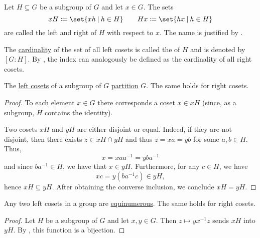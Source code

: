 \begin{definition}\label{def:group_cosets}
  Let \( H \subseteq G \) be a subgroup of \( G \) and let \( x \in G \). The sets
  \begin{equation*}
    x H \coloneqq \set{ xh \given h \in H }
    \quad\quad
    H x \coloneqq \set{ hx \given h \in H }
  \end{equation*}
  are called the left and right  of \( H \) with respect to \( x \). The name is justified by .

  The \hyperref[def:cardinal]{cardinality} of the set of all left cosets is called the  of \( H \) and is denoted by \( [G : H] \). By , the index can analogously be defined as the cardinality of all right cosets.
\end{definition}

\begin{lemma}\label{thm:group_coset_partition}
  The \hyperref[def:group_cosets]{left cosets} of a subgroup of \( G \) \hyperref[def:set_partition]{partition} \( G \). The same holds for right cosets.
\end{lemma}
\begin{proof}
  To each element \( x \in G \) there corresponds a coset \( x \in xH \) (since, as a subgroup, \( H \) contains the identity).

  Two cosets \( xH \) and \( yH \) are either disjoint or equal. Indeed, if they are not disjoint, then there exists \( z \in xH \cap yH \) and thus \( z = xa = yb \) for some \( a, b \in H \). Thus,
  \begin{equation*}
    x = x a a^{-1} = y b a^{-1}
  \end{equation*}
  and since \( b a^{-1} \in H \), we have that \( x \in yH \). Furthermore, for any \( c \in H \), we have
  \begin{equation*}
    xc = y(b a^{-1} c) \in yH,
  \end{equation*}
  hence \( xH \subseteq yH \). After obtaining the converse inclusion, we conclude \( xH = yH \).
\end{proof}

\begin{lemma}\label{thm:group_coset_bijection}
  Any two left cosets in a group are \hyperref[def:equinumerosity]{equinumerous}. The same holds for right cosets.
\end{lemma}
\begin{proof}
  Let \( H \) be a subgroup of \( G \) and let \( x, y \in G \). Then \( z \mapsto y x^{-1} z \) sends \( xH \) into \( yH \). By , this function is a bijection.
\end{proof}

